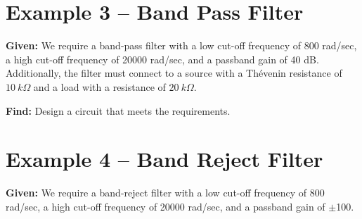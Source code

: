 \documentclass{handout}
\begin{document}
\newpage
\clearpage
\pagebreak

\section{Example 3 -- Band Pass Filter}
\noindent \textbf{Given:}  We require a band-pass filter with a low cut-off frequency of 800 rad/sec, a high cut-off frequency of 20000 rad/sec,  and a passband gain of 40 dB.  Additionally, the filter must connect to a source with a Th\'{e}venin resistance of $10 \ k\Omega$ and a load with a resistance of $20 \ k\Omega$.

\noindent \textbf{Find:}  Design a circuit that meets the requirements.


\newpage
\clearpage
\pagebreak

\section{Example 4 -- Band Reject Filter}

\noindent \textbf{Given:}  We require a band-reject filter with a low cut-off frequency of 800 rad/sec, a high cut-off frequency of 20000 rad/sec,  and a passband gain of $\pm$100.
\end{document}
